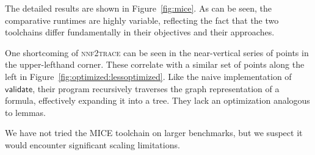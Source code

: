 \documentclass[letterpaper,USenglish,cleveref, autoref, thm-restate]{lipics-v2021}
\newcommand{\validate}{\textsf{validate}}
\newcommand{\progname}[1]{\textsc{#1}}
\begin{document}
 The detailed results are shown in
Figure~\ref{fig:mice}.  As can be seen, the comparative runtimes are
highly variable, reflecting the fact that the two toolchains differ
fundamentally in their objectives and their approaches.

One shortcoming of \progname{nnf2trace} can be seen in
the near-vertical series of points in the upper-lefthand corner.
These correlate with a similar set of points along the left in
Figure~\ref{fig:optimized:lessoptimized}.  Like the naive
implementation of $\validate$, their program recursively traverses the
graph representation of a formula, effectively expanding it into a
tree.  They lack an optimization analogous to lemmas.

We have not tried the MICE toolchain on larger benchmarks, but we
suspect it would encounter significant scaling limitations.


\end{document}
